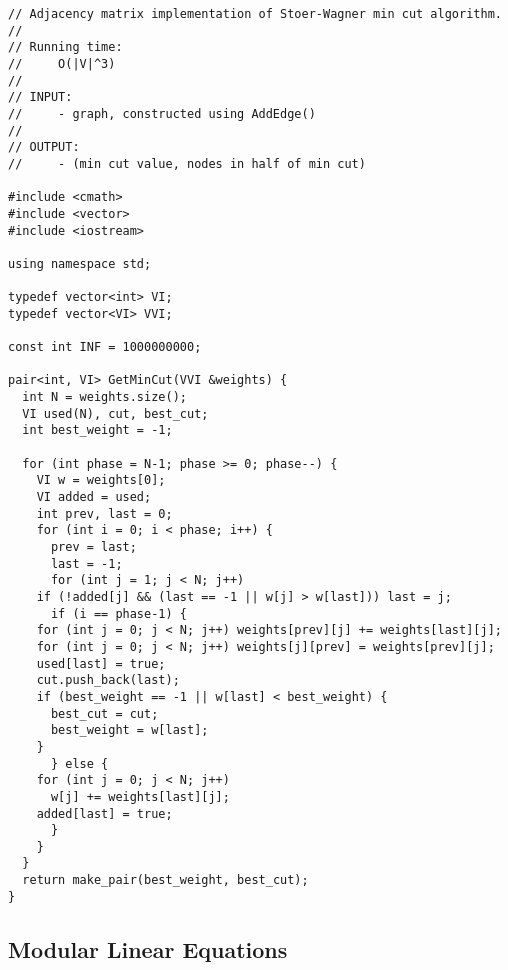 \documentclass[letterpaper]{article}
\begin{document}
\begin{lstlisting}
// Adjacency matrix implementation of Stoer-Wagner min cut algorithm.
//
// Running time:
//     O(|V|^3)
//
// INPUT: 
//     - graph, constructed using AddEdge()
//
// OUTPUT:
//     - (min cut value, nodes in half of min cut)

#include <cmath>
#include <vector>
#include <iostream>

using namespace std;

typedef vector<int> VI;
typedef vector<VI> VVI;

const int INF = 1000000000;

pair<int, VI> GetMinCut(VVI &weights) {
  int N = weights.size();
  VI used(N), cut, best_cut;
  int best_weight = -1;
  
  for (int phase = N-1; phase >= 0; phase--) {
    VI w = weights[0];
    VI added = used;
    int prev, last = 0;
    for (int i = 0; i < phase; i++) {
      prev = last;
      last = -1;
      for (int j = 1; j < N; j++)
	if (!added[j] && (last == -1 || w[j] > w[last])) last = j;
      if (i == phase-1) {
	for (int j = 0; j < N; j++) weights[prev][j] += weights[last][j];
	for (int j = 0; j < N; j++) weights[j][prev] = weights[prev][j];
	used[last] = true;
	cut.push_back(last);
	if (best_weight == -1 || w[last] < best_weight) {
	  best_cut = cut;
	  best_weight = w[last];
	}
      } else {
	for (int j = 0; j < N; j++)
	  w[j] += weights[last][j];
	added[last] = true;
      }
    }
  }
  return make_pair(best_weight, best_cut);
}
\end{lstlisting}

\clearpage
\subsection{Modular Linear Equations}
\end{document}
